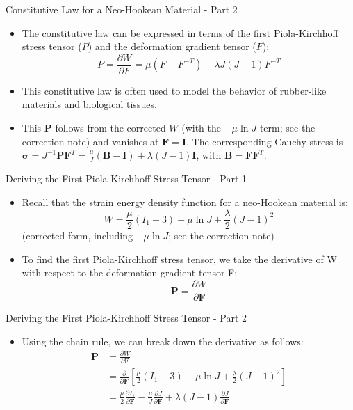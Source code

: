 \documentclass{beamer}
\begin{document}
\begin{frame}{Constitutive Law for a Neo-Hookean Material - Part 2}
\begin{itemize}
\item The constitutive law can be expressed in terms of the first Piola-Kirchhoff stress tensor ($P$) and the deformation gradient tensor ($F$):
\begin{equation*}
P = \frac{\partial W}{\partial F} = \mu (F - F^{-T}) + \lambda J (J - 1) F^{-T}
\end{equation*}
\item This constitutive law is often used to model the behavior of rubber-like materials and biological tissues.
\item This $\mathbf{P}$ follows from the corrected $W$ (with the $-\mu\ln J$ term; see the correction note) and vanishes at $\mathbf{F}=\mathbf{I}$. The corresponding Cauchy stress is $\boldsymbol{\sigma} = J^{-1}\mathbf{P}\mathbf{F}^T = \frac{\mu}{J}(\mathbf{B}-\mathbf{I}) + \lambda(J-1)\mathbf{I}$, with $\mathbf{B}=\mathbf{F}\mathbf{F}^T$.
\end{itemize}
\end{frame}

\begin{frame}{Deriving the First Piola-Kirchhoff Stress Tensor - Part 1}
\begin{itemize}
\item Recall that the strain energy density function for a neo-Hookean material is:
\begin{equation*}
W = \frac{\mu}{2} (I_1 - 3) - \mu\ln J + \frac{\lambda}{2} (J - 1)^2
\end{equation*}
(corrected form, including $-\mu\ln J$; see the correction note)
\item To find the first Piola-Kirchhoff stress tensor, we take the derivative of W with respect to the deformation gradient tensor F:
\begin{equation*}
\mathbf{P} = \frac{\partial W}{\partial \mathbf{F}}
\end{equation*}
\end{itemize}
\end{frame}

\begin{frame}{Deriving the First Piola-Kirchhoff Stress Tensor - Part 2}
\begin{itemize}
\item Using the chain rule, we can break down the derivative as follows:
\begin{align*}
\mathbf{P} &= \frac{\partial W}{\partial \mathbf{F}} \\
&= \frac{\partial}{\partial \mathbf{F}} \left[ \frac{\mu}{2} (I_1 - 3) - \mu\ln J + \frac{\lambda}{2} (J - 1)^2 \right] \\
&= \frac{\mu}{2} \frac{\partial I_1}{\partial \mathbf{F}} - \frac{\mu}{J}\frac{\partial J}{\partial \mathbf{F}} + \lambda (J - 1) \frac{\partial J}{\partial \mathbf{F}}
\end{align*}
\end{itemize}
\end{frame}
\end{document}
